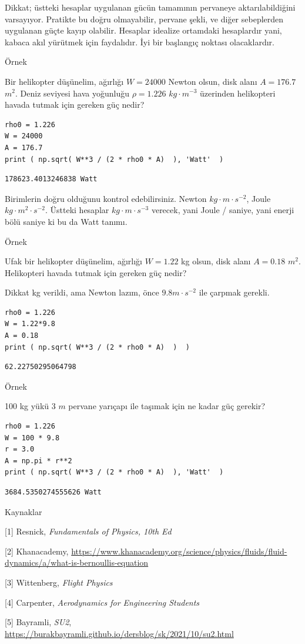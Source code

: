 \documentclass[12pt,fleqn]{article}\usepackage{../../common}
\begin{document}
Dikkat; üstteki hesaplar uygulanan gücün tamamının pervaneye
aktarılabildiğini varsayıyor. Pratikte bu doğru olmayabilir, pervane şekli,
ve diğer sebeplerden uygulanan güçte kayıp olabilir. Hesaplar idealize
ortamdaki hesaplardır yani, kabaca akıl yürütmek için faydalıdır. İyi bir
başlangıç noktası olacaklardır.

Örnek

Bir helikopter düşünelim, ağırlığı $W = 24000$ Newton olsun, disk alanı
$A = 176.7$ $m^2$. Deniz seviyesi hava yoğunluğu $\rho = 1.226$
$kg \cdot m^{-3}$ üzerinden helikopteri havada tutmak için gereken güç
nedir?

\begin{verbatim}
rho0 = 1.226
W = 24000
A = 176.7
print ( np.sqrt( W**3 / (2 * rho0 * A)  ), 'Watt'  )  
\end{verbatim}

\begin{verbatim}
178623.4013246838 Watt
\end{verbatim}

Birimlerin doğru olduğunu kontrol edebilirsiniz. Newton $kg \cdot m \cdot
s^{-2}$, Joule $kg \cdot m^2 \cdot s^{-2}$. Üstteki hesaplar $kg \cdot m
\cdot s^{-3}$ verecek, yani Joule / saniye, yani enerji bölü saniye ki bu
da Watt tanımı. 

Örnek

Ufak bir helikopter düşünelim, ağırlığı $W = 1.22$ kg olsun, disk alanı
$A = 0.18$ $m^2$. Helikopteri havada tutmak için gereken güç nedir?

Dikkat kg verildi, ama Newton lazım, önce $9.8 m \cdot s^{-2}$ ile çarpmak gerekli.

\begin{verbatim}
rho0 = 1.226
W = 1.22*9.8
A = 0.18
print ( np.sqrt( W**3 / (2 * rho0 * A)  )  )  
\end{verbatim}

\begin{verbatim}
62.22750295064798
\end{verbatim}

Örnek

100 kg yükü 3 $m$ pervane yarıçapı ile taşımak için ne kadar güç gerekir?

\begin{verbatim}
rho0 = 1.226
W = 100 * 9.8
r = 3.0
A = np.pi * r**2
print ( np.sqrt( W**3 / (2 * rho0 * A)  ), 'Watt'  ) 
\end{verbatim}

\begin{verbatim}
3684.5350274555626 Watt
\end{verbatim}

Kaynaklar

[1] Resnick, {\em Fundamentals of Physics, 10th Ed}

[2] Khanacademy, 
    \url{https://www.khanacademy.org/science/physics/fluids/fluid-dynamics/a/what-is-bernoullis-equation}

[3] Wittenberg, {\em Flight Physics}

[4] Carpenter, {\em Aerodynamics for Engineering Students}

[5] Bayramli, {\em SU2},
    \url{https://burakbayramli.github.io/dersblog/sk/2021/10/su2.html}
\end{document}
